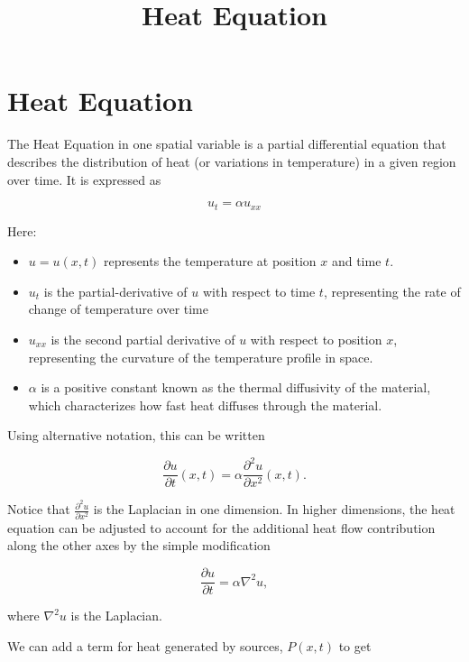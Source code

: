 \documentclass{article}
\title{Heat Equation}
\begin{document}
\section{Heat Equation}

The Heat Equation in one spatial variable is a partial differential equation that describes the distribution of heat (or variations in temperature) in a given region over time. It is expressed as

\[ u_t = \alpha u_{xx} \]

Here:

\begin{itemize}
\item $u = u(x,t)$ represents the temperature at position $x$ and time $t$.
\end{itemize}

\begin{itemize}
\item $u_t$ is the \@{partial-derivative} of $u$ with respect to time $t$, representing the rate of change of temperature over time
\end{itemize}

\begin{itemize}
\item $u_{xx}$ is the second partial derivative of $u$ with respect to position $x$, representing the curvature of the temperature profile in space.
\end{itemize}

\begin{itemize}
\item $\alpha$ is a positive constant known as the thermal diffusivity of the material, which characterizes how fast heat diffuses through the material.
\end{itemize}

Using alternative notation, this can be written

\[ \frac{\partial u}{\partial t}(x,t) = \alpha \frac{\partial^2 u}{\partial x^2}(x,t). \]

Notice that $\frac{\partial^2 u}{\partial x^2}$ is the \@{Laplacian} in one dimension. In higher dimensions, the heat equation can be adjusted to account for the additional heat flow contribution along the other axes by the simple modification

\[ \frac{\partial u}{\partial t} = \alpha \nabla^2 u, \]

where $\nabla^2 u$ is the \@{Laplacian}.

We can add a term for heat generated by sources, $P(x,t)$ to get
\end{document}
